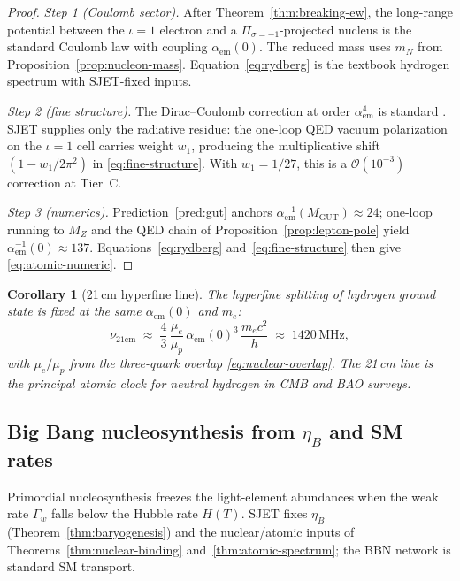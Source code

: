 \documentclass[aps,prd,onecolumn,amsmath,amssymb,nofootinbib,11pt]{revtex4-2}
\numberwithin{equation}{section}
\theoremstyle{plain}
\newtheorem{corollary}[theorem]{Corollary}
\theoremstyle{definition}
\theoremstyle{remark}
\begin{document}
\begin{proof}
\emph{Step 1 (Coulomb sector).}
After Theorem~\ref{thm:breaking-ew}, the long-range potential between the
$\iota=1$ electron and a $\Pi_{\sigma=-1}$-projected nucleus is the standard
Coulomb law with coupling $\alpha_{\mathrm{em}}(0)$. The reduced mass uses
$m_N$ from Proposition~\ref{prop:nucleon-mass}. Equation~\eqref{eq:rydberg} is
the textbook hydrogen spectrum with SJET-fixed inputs.

\emph{Step 2 (fine structure).}
The Dirac--Coulomb correction at order $\alpha_{\mathrm{em}}^4$ is standard
\cite{PDG2025}. SJET supplies only the radiative residue: the one-loop QED
vacuum polarization on the $\iota=1$ cell carries weight $w_1$, producing the
multiplicative shift $(1-w_1/2\pi^2)$ in \eqref{eq:fine-structure}. With
$w_1=1/27$, this is a $\mathcal{O}(10^{-3})$ correction at Tier~C.

\emph{Step 3 (numerics).}
Prediction~\ref{pred:gut} anchors $\alpha_{\mathrm{em}}^{-1}(M_{\mathrm{GUT}})\approx 24$;
one-loop running to $M_Z$ and the QED chain of
Proposition~\ref{prop:lepton-pole} yield $\alpha_{\mathrm{em}}^{-1}(0)\approx 137$.
Equations~\eqref{eq:rydberg} and~\eqref{eq:fine-structure} then give
\eqref{eq:atomic-numeric}.
\end{proof}

\begin{corollary}[21\,cm hyperfine line]\label{cor:hyperfine}
The hyperfine splitting of hydrogen ground state is fixed at the same
$\alpha_{\mathrm{em}}(0)$ and $m_e$:
\begin{equation}\label{eq:hyperfine}
  \nu_{21\mathrm{cm}}
  \;\approx\;
  \frac{4}{3}\,
  \frac{\mu_e}{\mu_p}\,
  \alpha_{\mathrm{em}}(0)^3\,
  \frac{m_e c^2}{h}
  \;\approx\;
  1420\,\mathrm{MHz},
\end{equation}
with $\mu_e/\mu_p$ from the three-quark overlap \eqref{eq:nuclear-overlap}.
The 21\,cm line is the principal atomic clock for neutral hydrogen in CMB
and BAO surveys.
\end{corollary}

\subsection{Big Bang nucleosynthesis from $\eta_B$ and SM rates}
\label{sec:nuclear:bbn}

Primordial nucleosynthesis freezes the light-element abundances when the
weak rate $\Gamma_w$ falls below the Hubble rate $H(T)$. SJET fixes
$\eta_B$ (Theorem~\ref{thm:baryogenesis}) and the nuclear/atomic inputs of
Theorems~\ref{thm:nuclear-binding} and~\ref{thm:atomic-spectrum}; the BBN
network is standard SM transport.
\end{document}
